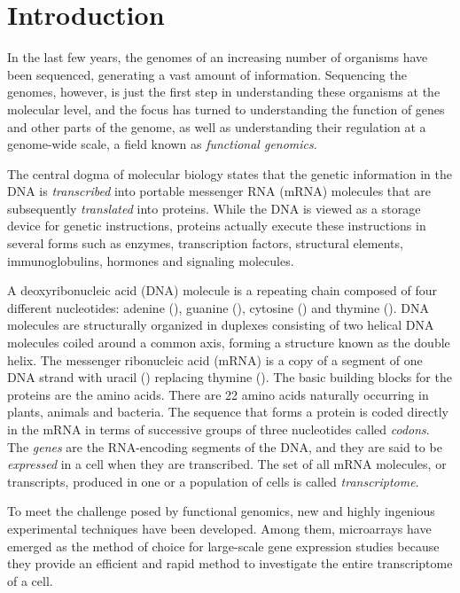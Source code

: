 \chapter{Introduction}
\label{ch:intro}

In the last few years, the genomes of an increasing number of organisms have
been sequenced, generating a vast amount of information. Sequencing the genomes,
however, is just the first step in understanding these organisms at the
molecular level, and the focus has turned to understanding the function of genes
and other parts of the genome, as well as understanding their regulation at a
genome-wide scale, a field known as \emph{functional genomics}.

The central dogma of molecular biology states that the genetic information in
the DNA is \emph{transcribed} into portable messenger RNA (mRNA) molecules that
are subsequently \emph{translated} into proteins. While the DNA is viewed as a
storage device for genetic instructions, proteins actually execute these
instructions in several forms such as enzymes, transcription factors, structural
elements, immunoglobulins, hormones and signaling molecules.

A deoxyribonucleic acid (DNA) molecule is a repeating chain composed of four
different nucleotides: adenine (\tA), guanine (\tG), cytosine (\tC) and thymine
(\tT). DNA molecules are structurally organized in duplexes consisting of two
helical DNA molecules coiled around a common axis, forming a structure known as
the double helix. The messenger ribonucleic acid (mRNA) is a copy of a segment
of one DNA strand with uracil (\tU) replacing thymine (\tT). The basic building
blocks for the proteins are the amino acids. There are 22 amino acids naturally
occurring in plants, animals and bacteria. The sequence that forms a protein is
coded directly in the mRNA in terms of successive groups of three nucleotides
called \emph{codons}. The \emph{genes} are the RNA-encoding segments of the DNA,
and they are said to be \emph{expressed} in a cell when they are transcribed.
The set of all mRNA molecules, or transcripts, produced in one or a
population of cells is called \emph{transcriptome}.

To meet the challenge posed by functional genomics, new and highly ingenious
experimental techniques have been developed. Among them, microarrays have
emerged as the method of choice for large-scale gene expression studies because
they provide an efficient and rapid method to investigate the entire
transcriptome of a cell.

